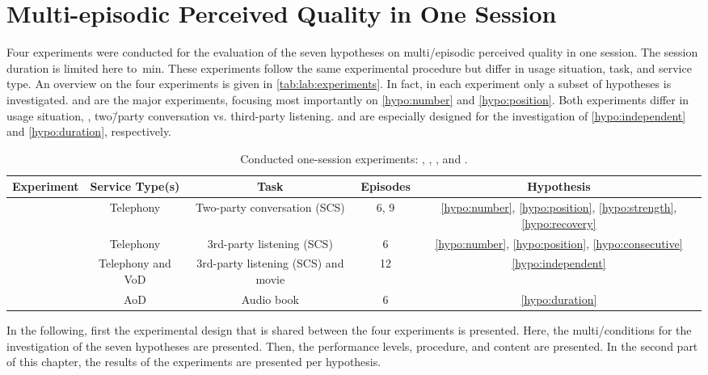 

\chapter{Multi-episodic Perceived Quality in One Session}\label{chap:lab}
Four experiments were conducted for the evaluation of the seven hypotheses on multi\-/episodic perceived quality in one session.
The session duration is limited here to~\unit[45]{min}.
These experiments follow the same experimental procedure but differ in usage situation, task, and service type.
An overview on the four experiments is given in \autoref{tab:lab:experiments}.
In fact, in each experiment only a subset of hypotheses is investigated.
 and \EIIa{} are the major experiments, focusing most importantly on \autoref{hypo:number} and \autoref{hypo:position}.
Both experiments differ in usage situation, \ie, two\=/party conversation vs. third-party listening.
\EIIb{} and  are especially designed for the investigation of \autoref{hypo:independent} and \autoref{hypo:duration}, respectively.

\label{E1}\label{E2a}\label{E2b}\label{E2}\label{E3}
\begin{table}[h]
	\centering
	\caption{Conducted one-session experiments: , \EIIa{}, \EIIb{}, and .}
	\label{tab:lab:experiments}
	\begin{tabulary}{\textwidth}{C|C|C|C|C}
	Experiment	& Service Type(s)	& Task					& Episodes	& Hypothesis \\
	\midrule
				& Telephony	& Two-party conversation (\ac{SCS})	& 6, 9 	& \autoref{hypo:number}, \autoref{hypo:position}, \autoref{hypo:strength}, \autoref{hypo:recovery} \\
	\hline
	\EIIa{}		& Telephony	& 3rd-party listening (\ac{SCS})	& 6		& \autoref{hypo:number}, \autoref{hypo:position}, \autoref{hypo:consecutive}\\
	\hline
	\EIIb{}		& Telephony and \ac{VoD}& 3rd-party listening (\ac{SCS}) and movie			& 12		& \autoref{hypo:independent}\\
	\hline
				& \ac{AoD}		& Audio book				& 6		& \autoref{hypo:duration}\\
	\end{tabulary}
\end{table}

In the following, first the experimental design that is shared between the four experiments is presented.
Here, the multi\-/conditions for the investigation of the seven hypotheses are presented.
Then, the performance levels, procedure, and content are presented.
In the second part of this chapter, the results of the experiments are presented per hypothesis.

